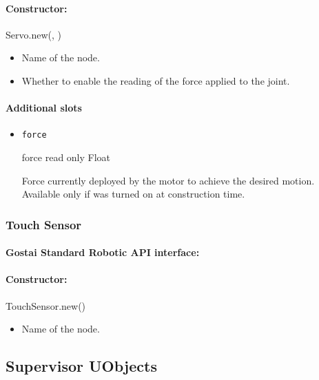 \paragraph{Constructor:} Servo.new(, )

\begin{itemize}
\item {} Name of the \webots node.
\item {} Whether to enable the reading of the force
  applied to the joint.
\end{itemize}

\paragraph{Additional slots}

\begin{itemize}
\item \lstinline{force}
\begin{attribute}{force}
  {read only}
  {Float}
  {}


  Force currently deployed by the motor to achieve the desired
  motion. Available only if  was turned on at
  construction time.
\end{attribute}
\end{itemize}

\subsubsection{Touch Sensor}

\paragraph{Gostai Standard Robotic API interface:} 

\paragraph{Constructor:} TouchSensor.new()

\begin{itemize}
\item {} Name of the \webots node.
\end{itemize}

\subsection{Supervisor \api UObjects}
\label{sec:webots:supervisor}

